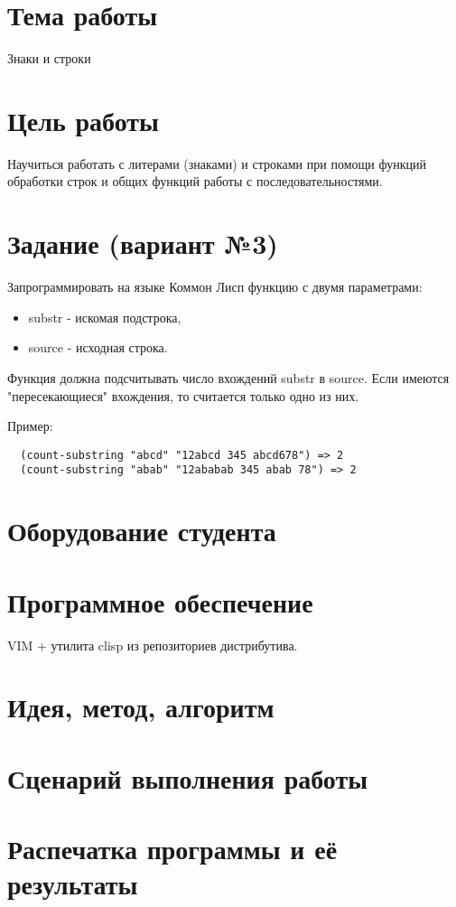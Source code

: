 \documentclass[12pt]{article}
\begin{document}

\section{Тема работы}
Знаки и строки

\section{Цель работы}
Научиться работать с литерами (знаками) и строками при помощи функций обработки
строк и общих функций работы с последовательностями.

\section{Задание (вариант №3)}
Запрограммировать на языке Коммон Лисп функцию с двумя параметрами:
\begin{itemize}
\item substr - искомая подстрока,
\item source - исходная строка.
\end{itemize}
Функция должна подсчитывать число вхождений substr в source.
Если имеются "пересекающиеся" вхождения, то считается только одно из них.

Пример:
\begin{lstlisting}
  (count-substring "abcd" "12abcd 345 abcd678") => 2
  (count-substring "abab" "12ababab 345 abab 78") => 2
\end{lstlisting}

\section{Оборудование студента}
\mypc

\section{Программное обеспечение}
VIM + утилита clisp из репозиториев дистрибутива.

\section{Идея, метод, алгоритм}
\section{Сценарий выполнения работы}
\section{Распечатка программы и её результаты}
\end{document}
